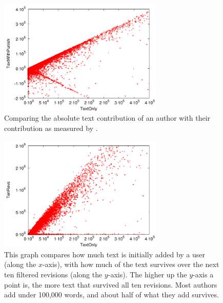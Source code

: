 \begin{figure}[tbhp]
    \begin{center}
    \includegraphics[width=0.70\textwidth]{part-I10-contrib/graphs/score-zoom-textonly-textwithpunish}
    \end{center}
    \caption[TextOnly vs TextWithPunish]{
    	Comparing the absolute text contribution of an author with
	their contribution as measured by \punish.
    }
    \label{fig-zoom-textonly-textwithpunish}
\end{figure}
%
\begin{figure}[tbhp]
    \begin{center}
    \includegraphics[width=0.70\textwidth]{part-I10-contrib/graphs/score-zoom-revisions-textonly}
    \end{center}
    \caption[Measuring short term text survival]{
    	This graph compares how much text is initially added
	by a user (along the $x$-axis), with how much
	of the text survives over the next ten filtered revisions
	(along the $y$-axis).
	The higher up the $y$-axis a point is, the more
	text that survived all ten revisions.
	Most authors add under 100,000 words,
	and about half of what they add survives.
    }
    \label{fig-zoom-revisions-textonly}
\end{figure}
